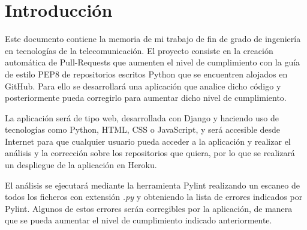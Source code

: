 \documentclass[a4paper, 12pt]{book}
\begin{document}

\tableofcontents 
\cleardoublepage
{} %
\listoffigures %
\cleardoublepage
{} %
\listoftables %



\cleardoublepage
\chapter{Introducción}
\label{chap:intro}
\label{sec:intro} %
Este documento contiene la memoria de mi trabajo de fin de grado de ingeniería en tecnologías de la telecomunicación.
El proyecto consiste en la creación automática de Pull-Requests que aumenten el nivel de cumplimiento con la guía de estilo PEP8 de repositorios escritos Python que se encuentren alojados en GitHub.
Para ello se desarrollará una aplicación que analice dicho código y posteriormente pueda corregirlo para aumentar dicho nivel de cumplimiento.

La aplicación será de tipo web, desarrollada con Django y haciendo uso de tecnologías como Python, HTML, CSS o JavaScript, y será accesible desde Internet para que cualquier usuario pueda acceder a la aplicación y realizar el análisis y la corrección sobre los repositorios que quiera, por lo que se realizará un despliegue de la aplicación en Heroku.

El análisis se ejecutará mediante la herramienta Pylint realizando un escaneo de todos los ficheros con extensión \textit{.py} y obteniendo la lista de errores indicados por Pylint.
Algunos de estos errores serán corregibles por la aplicación, de manera que se pueda aumentar el nivel de cumplimiento indicado anteriormente.
\end{document}
